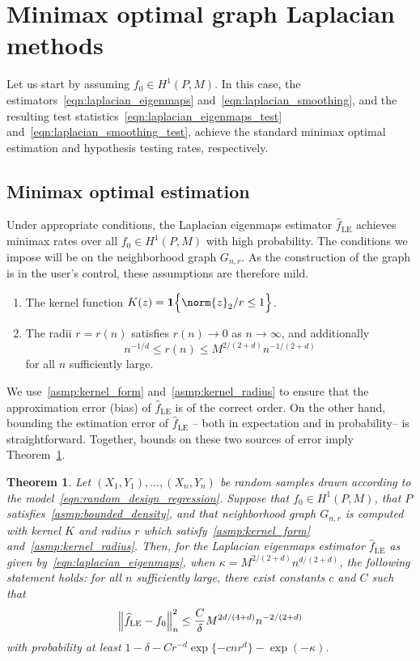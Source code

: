 \documentclass{article}
\newcommand{\1}{\mathbf{1}}
\newcommand{\wh}[1]{\widehat{#1}}
\newcommand{\LE}{\mathrm{LE}}
\theoremstyle{alden}
\theoremstyle{aldenthm}
\newtheorem{theorem}{Theorem}
\theoremstyle{definition}
\theoremstyle{remark}
\begin{document}
\section{Minimax optimal graph Laplacian methods}

Let us start by assuming $f_0 \in H^1(P,M)$. In this case, the estimators~\eqref{eqn:laplacian_eigenmaps} and~\eqref{eqn:laplacian_smoothing}, and the resulting test statistics~\eqref{eqn:laplacian_eigenmaps_test} and~\eqref{eqn:laplacian_smoothing_test}, achieve the standard minimax optimal estimation and hypothesis testing rates, respectively. 

\subsection{Minimax optimal estimation}

Under appropriate conditions, the Laplacian eigenmaps estimator $\wh{f}_{\LE}$ achieves minimax rates over all $f_0 \in H^1(P,M)$ with high probability. The conditions we impose will be on the neighborhood graph $G_{n,r}$. As the construction of the graph is in the user's control, these assumptions are therefore mild.
\begin{enumerate}[label=(K\arabic*)]
	\item 
	\label{asmp:kernel_form}
	The kernel function $K(z) = \1\Bigl\{\norm{z}_2/r \leq 1 \Bigr\}$.
	\item 
	\label{asmp:kernel_radius}
	The radii $r = r(n)$ satisfies $r(n) \to 0$ as $n \to \infty$, and additionally
	\begin{equation*}
	n^{-1/d}\leq r(n) \leq M^{2/(2 + d)}n^{-1/(2 + d)}
	\end{equation*}
	for all $n$ sufficiently large.
\end{enumerate}

We use~\ref{asmp:kernel_form} and~\ref{asmp:kernel_radius} to ensure that the approximation error (bias) of $\wh{f}_{\LE}$ is of the correct order. On the other hand, bounding the estimation error of $\wh{f}_{\LE}$ -- both in expectation and in probability-- is straightforward. Together, bounds on these two sources of error imply Theorem~\ref{thm:laplacian_eigenmaps_estimation1}.
\begin{theorem}
	\label{thm:laplacian_eigenmaps_estimation1}
	Let $(X_1,Y_1),\ldots,(X_n,Y_n)$ be random samples drawn according to the model~\eqref{eqn:random_design_regression}. Suppose that $f_0 \in H^1(P,M)$, that $P$ satisfies~\ref{asmp:bounded_density}, and that neighborhood graph $G_{n,r}$ is computed with kernel $K$ and radius $r$ which satisfy~\ref{asmp:kernel_form} and~\ref{asmp:kernel_radius}. Then, for the Laplacian eigenmaps estimator $\wh{f}_{\LE}$ as given by~\eqref{eqn:laplacian_eigenmaps}, when $\kappa = M^{2/(2 + d)}n^{d/(2 + d)}$, the following statement holds: for all $n$ sufficiently large, there exist constants $c$ and $C$ such that
	\begin{equation*}
	\Bigl\|\wh{f}_{\LE} - f_0\Bigr\|_n^2 \leq \frac{C}{\delta} M^{2d/(4 + d)} n^{-2/(2 + d)}
	\end{equation*}
	with probability at least $1 - \delta -  Cr^{-d}\exp\{-cnr^d\} - \exp(-\kappa)$.
\end{theorem}
\end{document}
